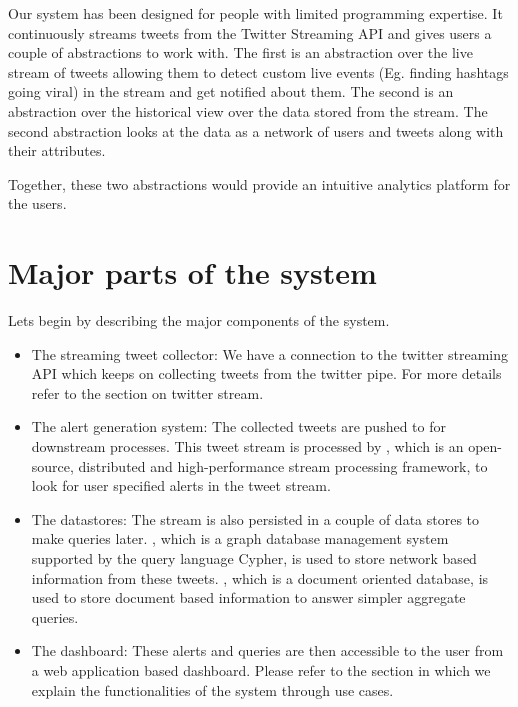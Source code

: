 \documentclass[letterpaper,10pt,english]{sphinxmanual}
\begin{document}
Our system has been designed for people with limited programming expertise. It continuously streams tweets from the Twitter Streaming API and gives users a couple of abstractions to work with. The first is an abstraction over the live stream of tweets allowing them to detect custom live events (Eg. finding hashtags going viral) in the stream and get notified about them. The second is an abstraction over the historical view over the data stored from the stream. The second abstraction looks at the data as a network of users and tweets along with their attributes.

Together, these two abstractions would provide an intuitive analytics platform for the users.


\section{Major parts of the system}
\label{\detokenize{introduction:major-parts-of-the-system}}
\noindent{}

Lets begin by describing the major components of the system.
\begin{itemize}
\item {} 
The streaming tweet collector: We have a connection to the twitter streaming API which keeps on collecting tweets from the twitter pipe. For more details refer to the section on twitter stream.

\item {} 
The alert generation system: The collected tweets are pushed to  for downstream processes. This tweet stream is processed by , which is an open-source, distributed and high-performance stream processing framework, to look for user specified alerts in the tweet stream.

\item {} 
The datastores: The stream is also persisted in a couple of data stores to make queries later. , which is a graph database management system supported by the query language Cypher, is used to store network based information from these tweets. , which is a document oriented database, is used to store document based information to answer simpler aggregate queries.

\item {} 
The dashboard: These alerts and queries are then accessible to the user from a web application based dashboard. Please refer to the section  {\hyperref[\detokenize{dashboard_website:dashboard-website}]{}} in which we explain the functionalities of the system through use cases.

\end{itemize}
\end{document}
